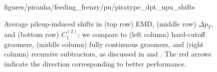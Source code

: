 \begin{figure}[p]
{        {figures/piranha/feeding_frenzy/pu/piratype_dpt_npu_shifts}
    }
    \\
\caption{
    Average pileup-induced shifts in (top row) EMD, (middle row) \(\Delta p_T\), and (bottom row) \(C_1^{(2)}\);
    we compare  to (left column) hard-cutoff groomers, (middle column) fully continuous groomers, and (right column) recursive subtractors, as discussed in  and .
    The red arrows indicate the direction corresponding to better performance.
}
\label{fig:pufrenzy_ave}
\end{figure}


